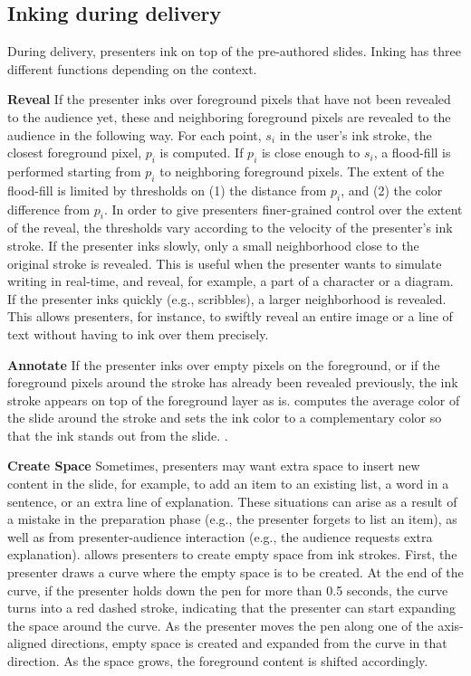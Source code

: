 \subsection{Inking during delivery}
During delivery, presenters ink on top of the pre-authored slides. Inking has three different functions depending on the context. 

\textbf{Reveal}
If the presenter inks over  foreground pixels that have not been revealed to the audience yet, these and neighboring foreground pixels are revealed to the audience in the following way. For each point, $s_i$ in the user's ink stroke, the closest foreground pixel, $p_i$ is computed. If $p_i$ is close enough to $s_i$, a flood-fill is performed starting from $p_i$ to neighboring foreground pixels. The extent of the flood-fill is limited by thresholds on (1) the distance from $p_i$, and (2) the color difference from $p_i$. In order to give presenters finer-grained control over the extent of the reveal, the thresholds vary according to the velocity of the presenter's ink stroke. If the presenter inks slowly, only a small neighborhood close to the original stroke is revealed. This is useful when the presenter wants to simulate writing in real-time, and reveal, for example, a part of a character or a diagram. If the presenter inks quickly (e.g., scribbles), a larger neighborhood is revealed. This allows presenters, for instance, to swiftly reveal an entire image or a line of text without having to ink over them precisely.  

\textbf{Annotate}
If the presenter inks over empty pixels on the foreground, or if the foreground pixels around the stroke has already been revealed previously, the ink stroke appears on top of the foreground layer as is. \interface computes the average color of the slide around the stroke and sets the ink color to a complementary color so that the ink stands out from the slide. . 

\textbf{Create Space}
Sometimes, presenters may want extra space to insert new content in the slide, for example, to add an item to an existing list, a word in a sentence, or an extra line of explanation. These situations can arise as a result of a mistake in the preparation phase (e.g., the presenter forgets to list an item), as well as from presenter-audience interaction (e.g., the audience requests extra explanation). \interface allows presenters to create empty space from ink strokes. First, the presenter draws a curve where the empty space is to be created. At the end of the curve, if the presenter holds down the pen for more than 0.5 seconds, the curve turns into a red dashed stroke, indicating that the presenter can start expanding the space around the curve. As the presenter moves the pen along one of the axis-aligned directions, empty space is created and expanded from the curve in that direction.  As the space grows, the foreground content is shifted accordingly. 
